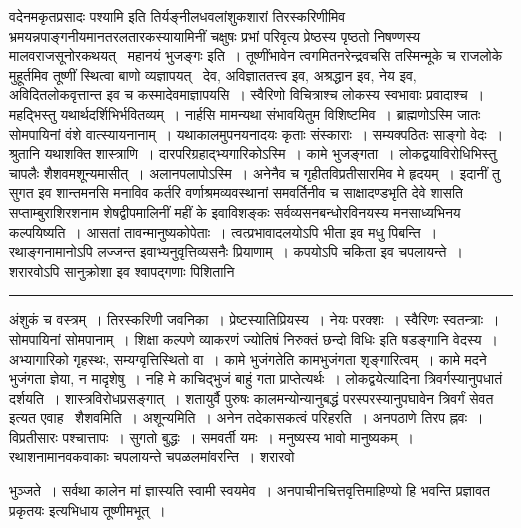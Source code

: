 \documentclass[11pt, openany]{book}
\begin{document}
\noindent
वदेनमकृतप्रसादः पश्यामि इति तिर्यङ्नीलधवलांशुकशारां तिरस्करिणीमिव भ्रमयन्नपाङ्गनीयमानतरलतारकस्यायामिनीं चक्षुषः प्रभां परिवृत्य प्रेष्ठस्य पृष्ठतो निषण्णस्य मालवराजसूनोरकथयत् \textendash\ {\haq महानयं भुजङ्गः} इति~। तूष्णींभावेन त्वगमितनरेन्द्रवचसि तस्मिन्मूके च राजलोके मुहूर्तमिव तूष्णीं स्थित्वा बाणो व्यज्ञापयत् \textendash\ देव, अविज्ञाततत्त्व इव, अश्रद्धान इव, नेय इव, अविदितलोकवृत्तान्त इव च कस्मादेवमाज्ञापयसि~। स्वैरिणो विचित्राश्च लोकस्य स्वभावाः प्रवादाश्च~। महद्भिस्तु यथार्थदर्शिभिर्भवितव्यम्~। नार्हसि मामन्यथा संभावयितुम विशिष्टमिव~। ब्राह्मणोऽस्मि जातः सोमपायिनां वंशे वात्स्यायनानाम्~। यथाकालमुपनयनादयः कृताः संस्काराः~। सम्यक्पठितः साङ्गो वेदः~। श्रुतानि यथाशक्ति शास्त्राणि~। दारपरिग्रहाद्भ्यगारिकोऽस्मि~। कामे भुजङ्गता~। लोकद्वयाविरोधिभिस्तु चापलैः शैशवमशून्यमासीत्~। अलानपलापोऽस्मि~। अनेनैव च गृहीतविप्रतीसारमिव मे हृदयम्~। इदानीं तु सुगत इव शान्तमनसि मनाविव कर्तरि वर्णाश्रमव्यवस्थानां समवर्तिनीव च साक्षादण्डभृति देवे शासति सप्ताम्बुराशिरशनाम शेषद्वीपमालिनीं महीं के इवाविशङ्कः सर्वव्यसनबन्धोरविनयस्य मनसाध्यभिनय कल्पयिष्यति~। आसतां तावन्मानुष्यकोपेताः~। त्वत्प्रभावादलयोऽपि भीता इव मधु पिबन्ति~। रथाङ्गनामानोऽपि लज्जन्त इवाभ्यनुवृत्तिव्यसनैः प्रियाणाम्~। कपयोऽपि चकिता इव चपलायन्ते~। शरारवोऽपि सानुक्रोशा इव श्वापद्गणाः पिशितानि

\vspace{2mm}
\hrule

\noindent
{\s अंशुकं च वस्त्रम्~। तिरस्करिणी जवनिका~। प्रेष्टस्यातिप्रियस्य~। नेयः परक्शः~। स्वैरिणः स्वतन्त्राः~। सोमपायिनां सोमपानाम्~। {\qt शिक्षा कल्पणे व्याकरणं ज्योतिषं निरुक्तं छन्दो विधिः} इति षडङ्गानि वेदस्य~। अभ्यागारिको गृहस्थः, सम्यग्वृत्तिस्थितो वा~। कामे भुजंगतेति कामभुजंगता शृङ्गारित्वम्~। कामे मदने भुजंगता ज्ञेया, न मादृशेषु~। नहि मे काचिद्भुजं बाहुं गता प्राप्तेत्यर्थः~। लोकद्वयेत्यादिना त्रिवर्गस्यानुपधातं दर्शयति~। शास्त्रविरोधप्रसङ्गात्~। शतायुर्वै पुरुषः कालमन्योन्यानुबद्धं परस्परस्यानुपघावेन त्रिवर्गं सेवत इत्यत एवाह \textendash\ {\qtt शैशवमिति~। अशून्यमिति}~। अनेन तदेकासकत्वं परिहरति~। अनपठाणे तिरप ह्नवः~। विप्रतीसारः पश्चात्तापः~। सुगतो बुद्धः~। समवर्ती यमः~। मनुष्यस्य भावो मानुष्यकम्~। रथाशनामानवकवाकाः चपलायन्ते चपळलमांवरन्ति~। शरारवो}

\newpage

\noindent
भुञ्जते~। सर्वथा कालेन मां ज्ञास्यति स्वामी स्वयमेव~। अनपाचीनचित्तवृत्तिमाहिण्यो हि भवन्ति प्रज्ञावत प्रकृतयः इत्यभिधाय तूष्णीमभूत्~।
\end{document}
